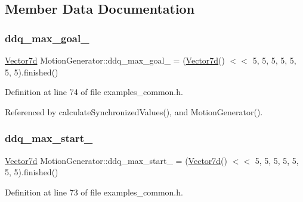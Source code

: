 \subsection{Member Data Documentation}
\mbox{\label{classMotionGenerator_afa25b16e5c66c9f23c9869fa992b0bd4}} 
\subsubsection{\texorpdfstring{ddq\+\_\+max\+\_\+goal\+\_\+}{ddq\_max\_goal\_}}
{\footnotesize\ttfamily \hyperlink{classMotionGenerator_a499bd17d3a5c7583b4c06923f532185d}{Vector7d} Motion\+Generator\+::ddq\+\_\+max\+\_\+goal\+\_\+ = (\hyperlink{classMotionGenerator_a499bd17d3a5c7583b4c06923f532185d}{Vector7d}() $<$$<$ 5, 5, 5, 5, 5, 5, 5).finished()\hspace{0.3cm}{\ttfamily [private]}}



Definition at line 74 of file examples\+\_\+common.\+h.



Referenced by calculate\+Synchronized\+Values(), and Motion\+Generator().

\mbox{\label{classMotionGenerator_aba35338c7023ab218a3c2991a36a79d4}} 
\subsubsection{\texorpdfstring{ddq\+\_\+max\+\_\+start\+\_\+}{ddq\_max\_start\_}}
{\footnotesize\ttfamily \hyperlink{classMotionGenerator_a499bd17d3a5c7583b4c06923f532185d}{Vector7d} Motion\+Generator\+::ddq\+\_\+max\+\_\+start\+\_\+ = (\hyperlink{classMotionGenerator_a499bd17d3a5c7583b4c06923f532185d}{Vector7d}() $<$$<$ 5, 5, 5, 5, 5, 5, 5).finished()\hspace{0.3cm}{\ttfamily [private]}}



Definition at line 73 of file examples\+\_\+common.\+h.



